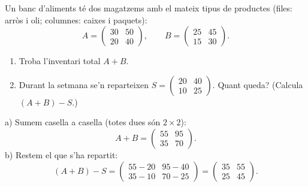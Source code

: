 \begin{exresolt}
Un banc d'aliments té dos magatzems amb el mateix tipus de productes (files:
arròs i oli; columnes: caixes i paquets):
\[
A=\begin{pmatrix} 30 & 50 \\ 20 & 40 \end{pmatrix},\qquad
B=\begin{pmatrix} 25 & 45 \\ 15 & 30 \end{pmatrix}.
\]
\begin{enumerate}[label=\alph*), leftmargin=1.6em, topsep=2pt]
  \item Troba l'inventari total $A+B$.
  \item Durant la setmana se'n reparteixen $S=\begin{pmatrix} 20 & 40 \\ 10 & 25 \end{pmatrix}$.
        Quant queda? (Calcula $(A+B)-S$.)
\end{enumerate}
\solucio
a) Sumem casella a casella (totes dues són $2\times 2$):
\[
A+B=\begin{pmatrix} 55 & 95 \\ 35 & 70 \end{pmatrix}.
\]
b) Restem el que s'ha repartit:
\[
(A+B)-S=\begin{pmatrix} 55-20 & 95-40 \\ 35-10 & 70-25 \end{pmatrix}
       =\begin{pmatrix} 35 & 55 \\ 25 & 45 \end{pmatrix}.
\]
\end{exresolt}

